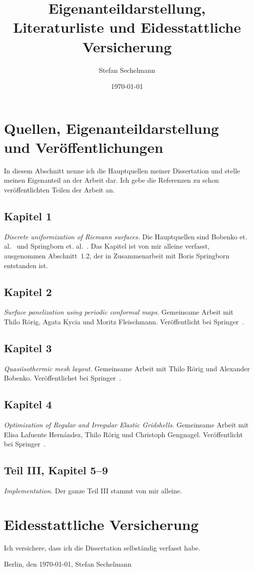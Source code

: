\documentclass[11pt]{article}
\title{Eigenanteildarstellung, Literaturliste und Eidesstattliche Versicherung}
\author{Stefan Sechelmann}
\date{\today}
\begin{document}
\maketitle

\section{Quellen, Eigenanteildarstellung und Ver\"{o}ffentlichungen}

In diesem Abschnitt nenne ich die Hauptquellen meiner Dissertation und stelle meinen Eigenanteil an der Arbeit dar. Ich gebe die Referenzen zu schon ver\"{o}ffentlichten Teilen der Arbeit an.

\subsection*{Kapitel 1}
\emph{Discrete uniformization of Riemann surfaces.}
Die Hauptquellen sind Bobenko et. al.~\cite{Bobenko2010} und Springborn et. al.~\cite{Springborn2008}. Das Kapitel ist von mir alleine verfasst, ausgenommen Abschnitt~1.2, der in Zusammenarbeit mit Boris Springborn entstanden ist.

\subsection*{Kapitel 2}
\emph{Surface panelization using periodic conformal maps.}
Gemeinsame Arbeit mit Thilo R\"{o}rig, Agata Kycia und Moritz Fleischmann. Ver\"{o}ffentlicht bei Springer~\cite{Roerig2014}.

\subsection*{Kapitel 3}
\emph{Quasiisothermic mesh layout.}
Gemeinsame Arbeit mit Thilo R\"{o}rig und Alexander Bobenko. Ver\"{o}ffentlichet bei Springer~\cite{Sechelmann2012}.

\subsection*{Kapitel 4}
\emph{Optimization of Regular and Irregular Elastic Gridshells.}
Gemeinsame Arbeit mit Elisa Lafuente Hern\'{a}ndez, Thilo R\"{o}rig und Christoph Gengnagel. Ver\"{o}ffentlicht bei Springer~\cite{Lafuente2012}.

\subsection*{Teil III, Kapitel 5--9}
\emph{Implementation.}
Der ganze Teil III stammt von mir alleine.


\section{Eidesstattliche Versicherung}
Ich versichere, dass ich die Dissertation selbst\"{a}ndig verfasst habe.


\vspace{2cm}
Berlin, den \today, Stefan Sechelmann




\end{document}
